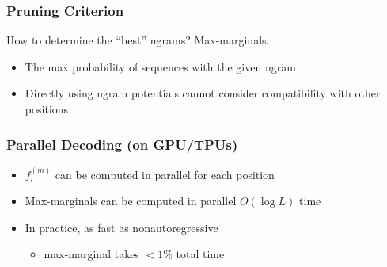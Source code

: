 \documentclass{beamer}
\begin{document}
\begin{frame}
\begin{center}
\begin{overlayarea}{\textwidth}{10cm}
\end{overlayarea}
\end{center}
\end{frame}

\begin{frame}
\frametitle{Pruning Criterion}
How to determine the “best” ngrams? Max-marginals.
\begin{itemize}
    \item The max probability of sequences with the given ngram
    \item Directly using ngram potentials cannot consider compatibility with other positions
\end{itemize}
\end{frame}

\begin{frame}
\frametitle{Parallel Decoding (on GPU/TPUs)}
\begin{itemize}
    \item<1-> $f_l^{(m)}$ can be computed in parallel for each position
    \item<2-> Max-marginals can be computed in parallel $O(\log L)$ time
    \item<4-> In practice, as fast as nonautoregressive
    \begin{itemize}
        \item max-marginal takes $<1\%$ total time
    \end{itemize}
\end{itemize}
\begin{overlayarea}{\textwidth}{4cm}
\begin{center}
\end{center}
\end{overlayarea}
\end{frame}
\end{document}
